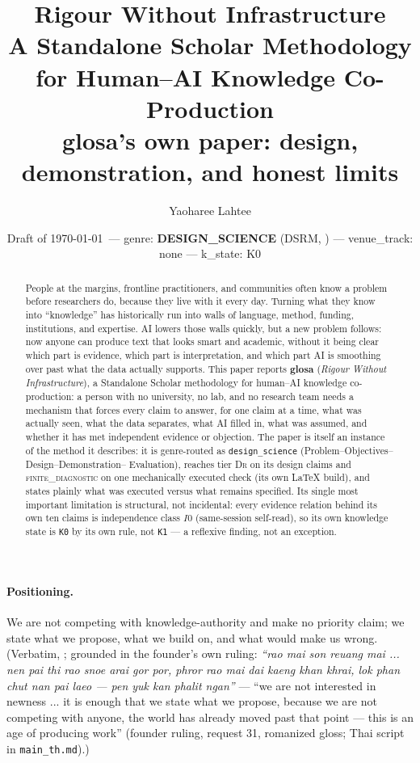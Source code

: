 \documentclass[11pt]{article}
\title{\vspace{-1em}\textbf{Rigour Without Infrastructure}\\[0.3em]
\large A Standalone Scholar Methodology for Human--AI Knowledge Co-Production\\[0.2em]
\normalsize glosa's own paper: design, demonstration, and honest limits}
\author[1]{Yaoharee Lahtee}
\affil[1]{Independent researcher / social-enterprise practitioner; Open Civil Science Initiative (standpoint in \Cref{sec:standpoint}); ORCID 0009-0005-3861-0626}
\date{Draft of \today\ --- genre: \textbf{DESIGN\_SCIENCE} (DSRM, \Cref{sec:genre}) --- venue\_track: none --- k\_state: K0}
\newcommand{\FiniteDiag}{\textsc{finite\_diagnostic}}
\newcommand{\DrTier}{\textsc{Dr}}
\begin{document}
\maketitle

\begin{abstract}
People at the margins, frontline practitioners, and communities often know a problem before
researchers do, because they live with it every day. Turning what they know into ``knowledge''
has historically run into walls of language, method, funding, institutions, and expertise. AI
lowers those walls quickly, but a new problem follows: now anyone can produce text that looks
smart and academic, without it being clear which part is evidence, which part is interpretation,
and which part AI is smoothing over past what the data actually supports. This paper reports
\textbf{glosa} (\emph{Rigour Without Infrastructure}), a Standalone Scholar methodology for
human--AI knowledge co-production: a person with no university, no lab, and no research team
needs a mechanism that forces every claim to answer, for one claim at a time, what was actually
seen, what the data separates, what AI filled in, what was assumed, and whether it has met
independent evidence or objection. The paper is itself an instance of the method it describes: it
is genre-routed as \texttt{design\_science} (Problem--Objectives--Design--Demonstration--
Evaluation), reaches tier \DrTier{} on its design claims and \FiniteDiag{} on one mechanically
executed check (its own LaTeX build), and states plainly what was executed versus what remains
specified. Its single most important limitation is structural, not incidental: every evidence
relation behind its own ten claims is independence class $I0$ (same-session self-read), so its own
knowledge state is \texttt{K0} by its own rule, not \texttt{K1} — a reflexive finding, not an
exception.
\end{abstract}

\paragraph{Positioning.} We are not competing with knowledge-authority and make
no priority claim; we state what we propose, what we build on, and what would
make us wrong. (Verbatim, \citealp[\S1.1]{lahtee2026foundation}; grounded in the founder's own
ruling: \emph{``rao mai son reuang mai ... nen pai thi rao snoe arai gor por, phror rao mai dai
kaeng khan khrai, lok phan chut nan pai laeo --- pen yuk kan phalit ngan''} --- ``we are not
interested in newness ... it is enough that we state what we propose, because we are not
competing with anyone, the world has already moved past that point --- this is an age of
producing work'' (founder ruling, request 31, romanized gloss; Thai script in
\texttt{main\_th.md}).)
\end{document}
